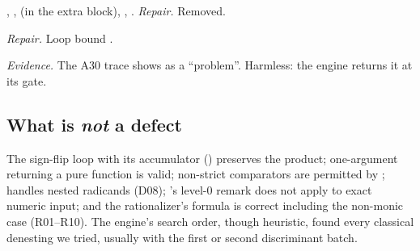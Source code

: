 , ,  (in the extra block),
, . \emph{Repair.} Removed.

\emph{Repair.} Loop bound .

\emph{Evidence.} The A30 trace shows  as a ``problem''.
Harmless: the engine returns it at its gate.

\subsection{What is \emph{not} a defect}
The sign-flip loop with its accumulator () preserves the product;
one-argument  returning a pure function is valid;
non-strict comparators are permitted by ;  handles nested radicands (D08); \RIII's level-0 
remark does not apply to exact numeric input; and the rationalizer's formula is
correct including the non-monic case (R01--R10). The engine's search order,
though heuristic, found every classical denesting we tried, usually with the
first or second discriminant batch.
